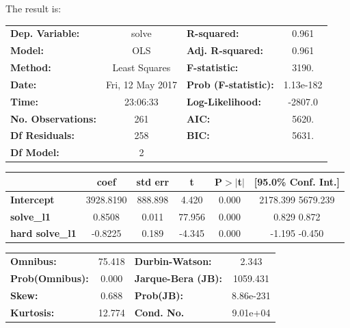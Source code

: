 \documentclass{article}
\begin{document}
The result is:

\begin{center}
\begin{tabular}{lclc}
\toprule
\textbf{Dep. Variable:}     &      solve       & \textbf{  R-squared:         } &     0.961   \\
\textbf{Model:}             &       OLS        & \textbf{  Adj. R-squared:    } &     0.961   \\
\textbf{Method:}            &  Least Squares   & \textbf{  F-statistic:       } &     3190.   \\
\textbf{Date:}              & Fri, 12 May 2017 & \textbf{  Prob (F-statistic):} & 1.13e-182   \\
\textbf{Time:}              &     23:06:33     & \textbf{  Log-Likelihood:    } &   -2807.0   \\
\textbf{No. Observations:}  &         261      & \textbf{  AIC:               } &     5620.   \\
\textbf{Df Residuals:}      &         258      & \textbf{  BIC:               } &     5631.   \\
\textbf{Df Model:}          &           2      & \textbf{                     } &             \\
\bottomrule
\end{tabular}
\begin{tabular}{lccccc}
                            & \textbf{coef} & \textbf{std err} & \textbf{t} & \textbf{P$>$$|$t$|$} & \textbf{[95.0\% Conf. Int.]}  \\
\midrule
\textbf{Intercept}          &    3928.8190  &      888.898     &     4.420  &         0.000        &      2178.399  5679.239       \\
\textbf{solve\_l1}           &       0.8508  &        0.011     &    77.956  &         0.000        &         0.829     0.872       \\
\textbf{hard  solve\_l1} &      -0.8225  &        0.189     &    -4.345  &         0.000        &        -1.195    -0.450       \\
\bottomrule
\end{tabular}
\begin{tabular}{lclc}
\textbf{Omnibus:}       & 75.418 & \textbf{  Durbin-Watson:     } &     2.343  \\
\textbf{Prob(Omnibus):} &  0.000 & \textbf{  Jarque-Bera (JB):  } &  1059.431  \\
\textbf{Skew:}          &  0.688 & \textbf{  Prob(JB):          } & 8.86e-231  \\
\textbf{Kurtosis:}      & 12.774 & \textbf{  Cond. No.          } &  9.01e+04  \\
\bottomrule
\end{tabular}
\end{center}
\end{document}
